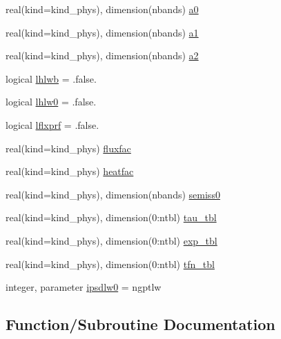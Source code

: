 \begin{DoxyCompactItemize}
\item 
real(kind=kind\+\_\+phys), dimension(nbands) \hyperlink{namespacemodule__radlw__main_ae55000724e738b7a5b7be4c8cef07553}{a0}
\item 
real(kind=kind\+\_\+phys), dimension(nbands) \hyperlink{namespacemodule__radlw__main_aeba888f00b19a65460f3b587c60ea4a0}{a1}
\item 
real(kind=kind\+\_\+phys), dimension(nbands) \hyperlink{namespacemodule__radlw__main_a1b4681c9bcc9434e30fef0ca4aaa9dcd}{a2}
\item 
logical \hyperlink{namespacemodule__radlw__main_a40b8a6f612a53e0a768cf922aa6f73c3}{lhlwb} = .false.
\item 
logical \hyperlink{namespacemodule__radlw__main_a7f8818436b81efe586d83b2f03b1617f}{lhlw0} = .false.
\item 
logical \hyperlink{namespacemodule__radlw__main_aec461dc1a50b326daa15c57c7dc55602}{lflxprf} = .false.
\item 
real(kind=kind\+\_\+phys) \hyperlink{namespacemodule__radlw__main_a3c31da677e01139d9a3f1e0795a0b614}{fluxfac}
\item 
real(kind=kind\+\_\+phys) \hyperlink{namespacemodule__radlw__main_a75ff8e29e21f0d07684d4a09c744daec}{heatfac}
\item 
real(kind=kind\+\_\+phys), dimension(nbands) \hyperlink{namespacemodule__radlw__main_ae3b32aa685e5f07a0003c5e919d22996}{semiss0}
\item 
real(kind=kind\+\_\+phys), dimension(0\+:ntbl) \hyperlink{namespacemodule__radlw__main_a9f73814ee0b1840d8c546ef341645f43}{tau\+\_\+tbl}
\item 
real(kind=kind\+\_\+phys), dimension(0\+:ntbl) \hyperlink{namespacemodule__radlw__main_ac2f240a927351a68fc9063321a307891}{exp\+\_\+tbl}
\item 
real(kind=kind\+\_\+phys), dimension(0\+:ntbl) \hyperlink{namespacemodule__radlw__main_a71dcfb3c365280e100e180fd1ce939ad}{tfn\+\_\+tbl}
\item 
integer, parameter \hyperlink{namespacemodule__radlw__main_a9b634a4f7b06ffdd919de69a165edadc}{ipsdlw0} = ngptlw
\end{DoxyCompactItemize}


\subsection{Function/\+Subroutine Documentation}
